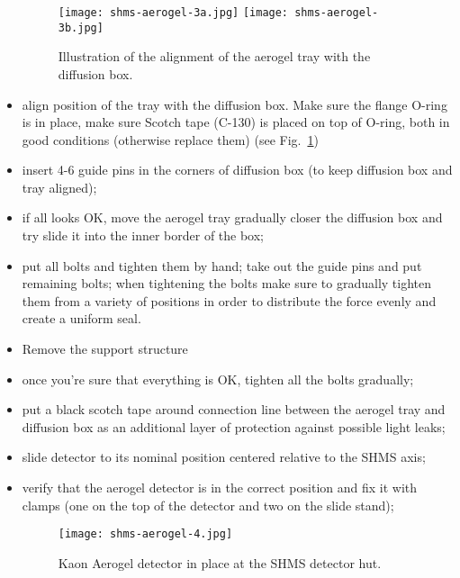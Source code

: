 \begin{itemize}
\begin{figure}
\begin{center}
\texttt{[image: shms-aerogel-3a.jpg]}
\texttt{[image: shms-aerogel-3b.jpg]}
\caption{\label{fig:shms-aerogel-3}Illustration of the alignment of
  the aerogel tray with the diffusion box.}
\end{center}
\end{figure}


  \item align position of the tray with the diffusion box. Make sure
    the flange O-ring is in place, make sure Scotch tape (C-130) is
    placed on top of O-ring, both in good conditions (otherwise
    replace them) (see Fig.~\ref{fig:shms-aerogel-3})
  \item insert 4-6 guide pins in the corners of diffusion box (to keep
    diffusion box and tray aligned);
  \item if all looks OK, move the aerogel tray gradually closer the
    diffusion box and try slide it into the inner border of the box;
  \item put all bolts and tighten them by hand; take out the guide
    pins and put remaining bolts; when tightening the bolts make sure
    to gradually tighten them from a variety of positions in order to
    distribute the force evenly and create a uniform seal.
\item Remove the support structure
\item once you're sure that
  everything is OK, tighten all the bolts gradually;
\item put a black
  scotch tape around connection line between the aerogel tray and
  diffusion box as an additional layer of protection against
  possible light leaks;
\item slide detector to its nominal position
  centered relative to the SHMS axis;
\item verify that the aerogel detector
  is in the correct position and fix it with clamps (one on the top
  of the detector and two on the slide stand);

\begin{figure}
\begin{center}
\texttt{[image: shms-aerogel-4.jpg]}
\caption{\label{fig:shms-aerogel-4}Kaon Aerogel detector in place at the SHMS detector hut.}
\end{center}
\end{figure}


\end{itemize}
